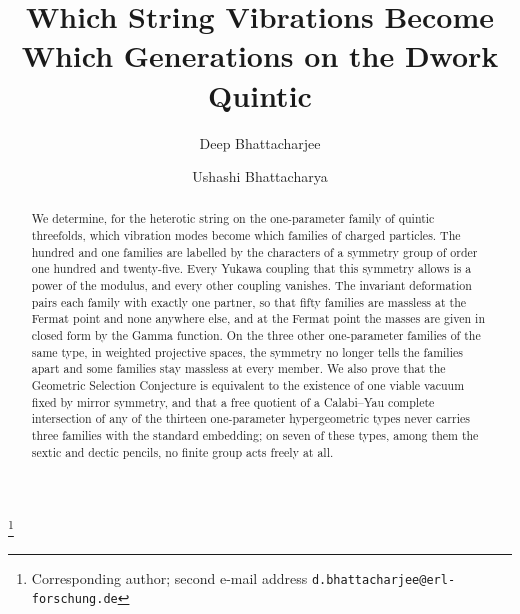 \documentclass[11pt]{amsart}
\theoremstyle{definition}
\theoremstyle{remark}
\begin{document}
\title{Which String Vibrations Become Which Generations on the Dwork Quintic}

\author{Deep Bhattacharjee}
\address{Formerly, Electro-Gravitational Space Propulsion Laboratory (EGSPL), Bhubaneswar, Odisha 751030, India}
\address{Formerly, University of Calcutta, Senate House, 87/1 College Street, Kolkata 700073, West Bengal, India}
\thanks{Corresponding author; second e-mail address \nolinkurl{d.bhattacharjee@erl-forschung.de}}

\author{Ushashi Bhattacharya}
\address{Formerly, National Taiwan University, Taipei 106319, Taiwan}


\begin{abstract}
We determine, for the heterotic string on the one-parameter family of
quintic threefolds, which vibration modes become which families of charged
particles. The hundred and one families are labelled by the characters of a
symmetry group of order one hundred and twenty-five. Every Yukawa coupling
that this symmetry allows is a power of the modulus, and every other
coupling vanishes. The invariant deformation pairs each family with exactly
one partner, so that fifty families are massless at the Fermat point and
none anywhere else, and at the Fermat point the masses are given in closed
form by the Gamma function. On the three other one-parameter families of
the same type, in weighted projective spaces, the symmetry no longer tells
the families apart and some families stay massless at every member. We
also prove that the Geometric Selection Conjecture is equivalent to the
existence of one viable vacuum fixed by mirror symmetry, and that a free
quotient of a Calabi--Yau complete intersection of any of the thirteen
one-parameter hypergeometric types never carries three families with the
standard embedding; on seven of these types, among them the sextic and
dectic pencils, no finite group acts freely at all.
\end{abstract}

\maketitle
\end{document}
